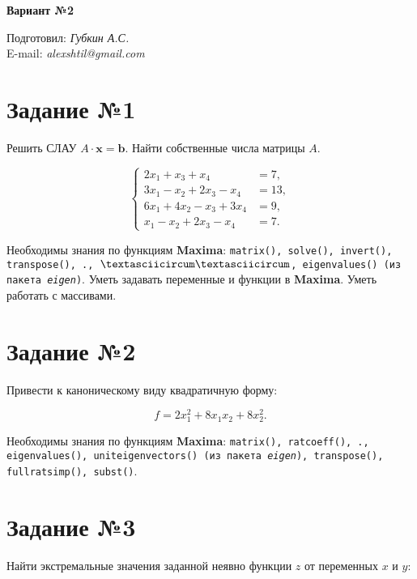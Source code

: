 \begin{center}
	\textbf{\huge Вариант №2}
\end{center}

\begin{flushright}
	Подготовил: \textit{Губкин А.С.}\\
	E-mail: \textit{alexshtil@gmail.com}\\
\end{flushright}

\section*{Задание №1}

    Решить СЛАУ $A \cdot \mathbf{x} = \mathbf{b}$. Найти собственные числа матрицы $A$.

    \[
        \left\{
            \begin{aligned}
                2 x_{1} + x_{3} + x_{4} &= 7,\\
                3 x_{1} - x_{2} + 2 x_{3} - x_{4} &= 13,\\
                6 x_{1} + 4 x_{2} - x_{3} + 3 x_{4} &= 9,\\
                x_{1} - x_{2} + 2 x_{3} - x_{4} &= 7.
            \end{aligned}
        \right.
    \]

    Необходимы знания по функциям \textbf{Maxima}: {\tt matrix(), solve(), invert(), transpose(), ., $\textasciicircum \textasciicircum$, eigenvalues() (из пакета \textit{eigen})}. Уметь задавать переменные и функции в \textbf{Maxima}. Уметь работать с массивами.

\section*{Задание №2}

	Привести к каноническому виду квадратичную форму: 

	\[
		f = 2 x^{2}_{1} + 8 x_{1} x_{2} + 8 x^{2}_{2}.
	\]

	Необходимы знания по функциям \textbf{Maxima}: {\tt matrix(), ratcoeff(), ., eigenvalues(), uniteigenvectors() (из пакета \textit{eigen}), transpose(), fullratsimp(), subst()}.

\section*{Задание №3}

	Найти экстремальные значения заданной неявно функции $z$ от переменных $x$ и $y$:

